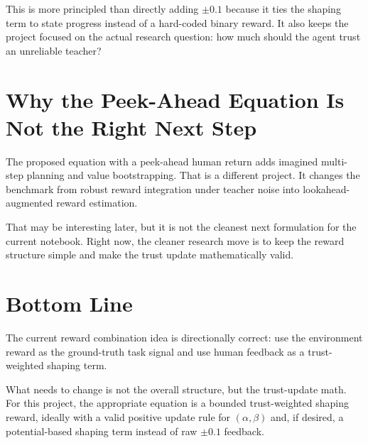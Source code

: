 \documentclass[11pt]{article}
\begin{document}
This is more principled than directly adding $\pm 0.1$ because it ties the shaping term to state progress instead of a hard-coded binary reward. It also keeps the project focused on the actual research question: how much should the agent trust an unreliable teacher?

\section*{Why the Peek-Ahead Equation Is Not the Right Next Step}

The proposed equation with a peek-ahead human return adds imagined multi-step planning and value bootstrapping. That is a different project. It changes the benchmark from robust reward integration under teacher noise into lookahead-augmented reward estimation.

That may be interesting later, but it is not the cleanest next formulation for the current notebook. Right now, the cleaner research move is to keep the reward structure simple and make the trust update mathematically valid.

\section*{Bottom Line}

The current reward combination idea is directionally correct: use the environment reward as the ground-truth task signal and use human feedback as a trust-weighted shaping term.

What needs to change is not the overall structure, but the trust-update math. For this project, the appropriate equation is a bounded trust-weighted shaping reward, ideally with a valid positive update rule for $(\alpha, \beta)$ and, if desired, a potential-based shaping term instead of raw $\pm 0.1$ feedback.
\end{document}
